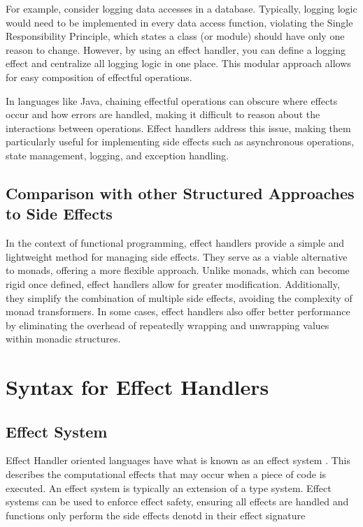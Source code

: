 \documentclass[logo,bsc,singlespacing,parskip]{infthesis}
\begin{document}
For example, consider logging data accesses in a database. Typically, logging logic would need to be implemented in every data access function, violating the Single Responsibility Principle, which states a class (or module) should have only one reason to change. However, by using an effect handler, you can define a logging effect and centralize all logging logic in one place. This modular approach allows for easy composition of effectful operations. 

In languages like Java, chaining effectful operations can obscure where effects occur and how errors are handled, making it difficult to reason about the interactions between operations. Effect handlers address this issue, making them particularly useful for implementing side effects such as asynchronous operations, state management, logging, and exception handling. 

\subsection{Comparison with other Structured Approaches to Side Effects}
In the context of functional programming, effect handlers provide a simple and lightweight method for managing side effects. They serve as a viable alternative to monads, offering a more flexible approach. Unlike monads, which can become rigid once defined, effect handlers allow for greater modification. Additionally, they simplify the combination of multiple side effects, avoiding the complexity of monad transformers. In some cases, effect handlers also offer better performance by eliminating the overhead of repeatedly wrapping and unwrapping values within monadic structures. 


\section{Syntax for Effect Handlers}

\subsection{Effect System}
Effect Handler oriented languages have what is known as an effect system \cite{bauer_effect_2013}. This describes the computational effects that may occur when a piece of code is executed. An effect system is typically an extension of a type system. Effect systems can be used to enforce effect safety, ensuring all effects are handled and functions only perform the side effects denotd in their effect signature
\end{document}
